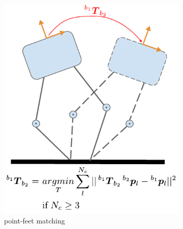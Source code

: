 \begin{figure}
    \centering
    \begin{subfigure}{.33\linewidth}
        \label{fig:kin_point_matching}
        \centering
        \includegraphics[width=\textwidth]{figures/robot_kinematic_types_point_matching.pdf}
        \caption{point-feet matching}
    \end{subfigure}%
    \hfill
    \begin{subfigure}{.33\linewidth}
        \label{fig:kin_point_direct}
        \centering

\end{subfigure}
\end{figure}
